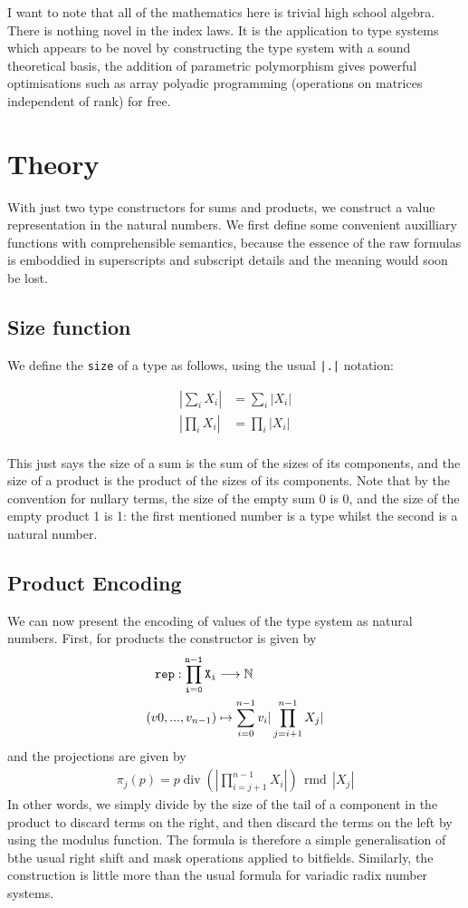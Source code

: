 \documentclass{article}
\DeclareMathOperator{\quot}{div}
\DeclareMathOperator{\rmd}{rmd}
\begin{document}
I want to note that all of the mathematics here is trivial high school
algebra. There is nothing novel in the index laws. It is the application
to type systems which appears to be novel by constructing the type
system with a sound theoretical basis, the addition of parametric
polymorphism gives powerful optimisations such as array polyadic
programming (operations on matrices independent of rank) for free.


\section{Theory}
With just two type constructors for sums and products, we construct a value
representation in the natural numbers. We first define some convenient 
auxilliary functions with comprehensible semantics, because the essence
of the raw formulas is emboddied in superscripts and subscript details
and the meaning would soon be lost.

\subsection{Size function}
We define the \verb$size$ of a type as follows, using the usual \verb$|.|$ notation:

\begin{align*}
|\sum_iX_i| &= \sum_i|X_i|\\
|\prod_iX_i| &= \prod_i|X_i|\\
\end{align*}

This just says the size of a sum is the sum of the sizes of its components,
and the size of a product is the product of the sizes of its components.
Note that by the convention for nullary terms, the size of the empty sum 0
is 0, and the size of the empty product 1 is 1: the first mentioned number
is a type whilst the second is a natural number.

\subsection{Product Encoding}
We can now present the encoding of values of the type system as natural numbers.
First, for products the constructor is given by
\begin{align*}
\tt{rep}: \prod_{i=0}^{n-1}X_i &\longrightarrow \mathbb{N}\\
(v0, ... ,v_{n-1}) &\mapsto \sum_{i=0}^{n-1}v_i | \prod_{j=i+1}^{n-1} X_j|
\end{align*}
and the projections are given by
\begin{align*}
\pi_j (p) = p \quot (|\prod_{i=j+1}^{n-1}X_i|) \, \rmd \, |X_j|
\end{align*}
In other words, we simply divide by the size of the tail of a component
in the product to discard terms on the right, and then discard the terms
on the left by using the modulus function.  The formula is therefore
a simple generalisation of bthe usual right shift and mask operations
applied to bitfields. Similarly, the construction is little more
than the usual formula for variadic radix number systems.
\end{document}
